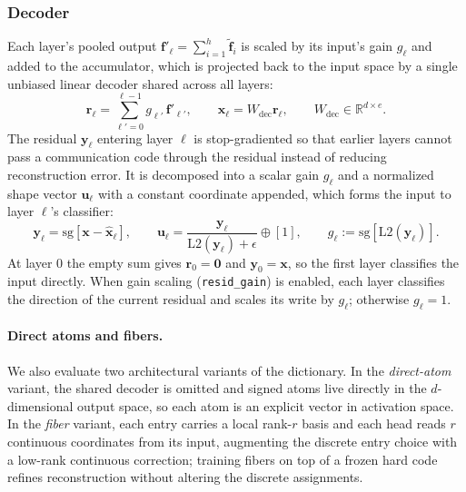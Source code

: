 \subsubsection{Decoder}
\label{sec:decoder}
Each layer's pooled output $\mathbf{f}'_\ell = \sum_{i=1}^{h}\tilde{\mathbf{f}}_{i}$ is scaled
by its input's gain $g_\ell$ and added to the accumulator, which is
projected back to the input space by a single unbiased linear decoder
shared across all layers:
\begin{equation}
	\mathbf{r}_\ell = \sum_{\ell'=0}^{\ell-1} g_{\ell'}\,\mathbf{f}'_{\ell'},
	\qquad
	\hat{\mathbf{x}}_\ell = W_{\mathrm{dec}}\mathbf{r}_\ell,
	\qquad
	W_{\mathrm{dec}} \in \mathbb{R}^{d \times e}.
	\label{eq:dec}
\end{equation}
The residual $\mathbf{y}_\ell$ entering layer $\ell$ is stop-gradiented
so that earlier layers cannot pass a communication code through the
residual instead of reducing reconstruction error. It is decomposed into
a scalar gain $g_\ell$ and a normalized shape vector $\mathbf{u}_\ell$
with a constant coordinate appended, which forms the input to layer
$\ell$'s classifier:
\begin{equation}
	\mathbf{y}_\ell = \mathrm{sg}\!\left[\mathbf{x} - \hat{\mathbf{x}}_\ell\right],
	\qquad
	\mathbf{u}_\ell =
	\frac{\mathbf{y}_\ell}{\mathrm{L2}(\mathbf{y}_\ell) + \epsilon} \oplus [1],
	\qquad
	g_{\ell} := \mathrm{sg}\!\left[\mathrm{L2}(\mathbf{y}_\ell)\right].
	\label{eq:y_norm}
\end{equation}
At layer 0 the empty sum gives $\mathbf{r}_0 = \mathbf{0}$ and
$\mathbf{y}_0 = \mathbf{x}$, so the first layer classifies the input
directly. When gain scaling (\texttt{resid\_gain}) is enabled, each
layer classifies the direction of the current residual and scales its
write by $g_\ell$; otherwise $g_\ell = 1$.

\paragraph{Direct atoms and fibers.}
We also evaluate two architectural variants of the dictionary. In the
\emph{direct-atom} variant, the shared decoder is omitted and signed
atoms live directly in the $d$-dimensional output space, so each atom is
an explicit vector in activation space. In the \emph{fiber} variant, each
entry carries a local rank-$r$ basis and each head reads $r$ continuous
coordinates from its input, augmenting the discrete entry choice with a
low-rank continuous correction; training fibers on top of a frozen hard
code refines reconstruction without altering the discrete assignments.

